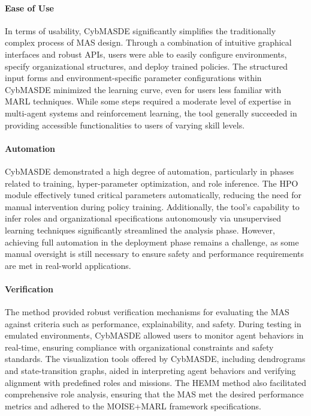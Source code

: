 \documentclass[sigconf,anonymous]{aamas}
\begin{document}
\paragraph{Ease of Use}

In terms of usability, CybMASDE significantly simplifies the traditionally complex process of MAS design. Through a combination of intuitive graphical interfaces and robust APIs, users were able to easily configure environments, specify organizational structures, and deploy trained policies. The structured input forms and environment-specific parameter configurations within CybMASDE minimized the learning curve, even for users less familiar with MARL techniques. While some steps required a moderate level of expertise in multi-agent systems and reinforcement learning, the tool generally succeeded in providing accessible functionalities to users of varying skill levels.

\paragraph{Automation}

CybMASDE demonstrated a high degree of automation, particularly in phases related to training, hyper-parameter optimization, and role inference. The HPO module effectively tuned critical parameters automatically, reducing the need for manual intervention during policy training. Additionally, the tool's capability to infer roles and organizational specifications autonomously via unsupervised learning techniques significantly streamlined the analysis phase. However, achieving full automation in the deployment phase remains a challenge, as some manual oversight is still necessary to ensure safety and performance requirements are met in real-world applications.

\paragraph{Verification}

The method provided robust verification mechanisms for evaluating the MAS against criteria such as performance, explainability, and safety. During testing in emulated environments, CybMASDE allowed users to monitor agent behaviors in real-time, ensuring compliance with organizational constraints and safety standards. The visualization tools offered by CybMASDE, including dendrograms and state-transition graphs, aided in interpreting agent behaviors and verifying alignment with predefined roles and missions. The HEMM method also facilitated comprehensive role analysis, ensuring that the MAS met the desired performance metrics and adhered to the MOISE+MARL framework specifications.
\end{document}
